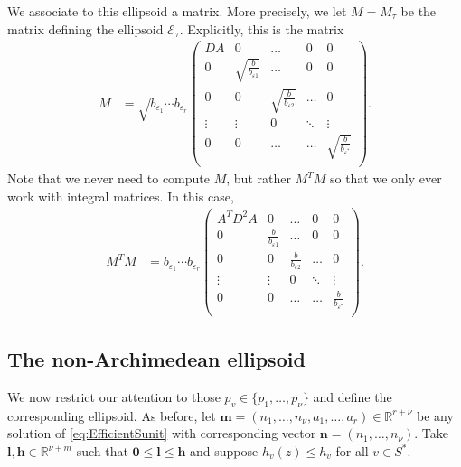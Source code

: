 We associate to this ellipsoid a matrix. More precisely, we let $M=M_\tau$ be the matrix defining the ellipsoid $\mathcal{E}_{\tau}$. Explicitly, this is the matrix
\begin{align*}
M &=\sqrt{b_{\varepsilon_1}\cdots b_{\varepsilon_r}}\begin{pmatrix}
	DA & 0 & \dots & 0 & 0\\
	0 & \sqrt{\frac{b}{b_{\varepsilon 1}}} & \dots & 0 & 0\\
	0 & 0  & \sqrt{\frac{b}{b_{\varepsilon 2}}} & \dots & 0\\
	\vdots & \vdots &0 &  \ddots & \vdots\\ 
	0 & 0 & \dots & \dots & \sqrt{\frac{b}{b_{\varepsilon^*}}} \\
	\end{pmatrix}.
\end{align*}	
Note that we never need to compute $M$, but rather $M^TM$ so that we only ever work with integral matrices. In this case, 
\begin{align*}
M^TM &= b_{\varepsilon_1}\cdots b_{\varepsilon_r}\begin{pmatrix}
	A^TD^2A & 0 & \dots & 0 & 0\\
	0 & \frac{b}{b_{\varepsilon 1}} & \dots & 0 & 0\\
	0 & 0  & \frac{b}{b_{\varepsilon 2}} & \dots & 0\\
	\vdots & \vdots &0 &  \ddots & \vdots\\ 
	0 & 0 & \dots & \dots & \frac{b}{b_{\varepsilon^*}} \\
	\end{pmatrix}.
\end{align*}	



\subsection{The non-Archimedean ellipsoid}
\label{subsec:nonArchEllipsoid}

We now restrict our attention to those $p_v \in \{p_1, \dots, p_{\nu}\}$ and define the corresponding ellipsoid. As before, let $\mathbf{m} = (n_1, \dots, n_{\nu}, a_1, \dots, a_r) \in \mathbb{R}^{r + \nu}$ be any solution of \eqref{eq:EfficientSunit} with corresponding vector $\mathbf{n} = (n_1, \dots, n_{\nu})$. Take $\mathbf{l},\mathbf{h}\in\mathbb{R}^{\nu+m}$ such that $\mathbf{0} \leq \mathbf{l} \leq \mathbf{h}$ and suppose $h_v(z)\leq h_v$ for all $v\in S^*$. 

